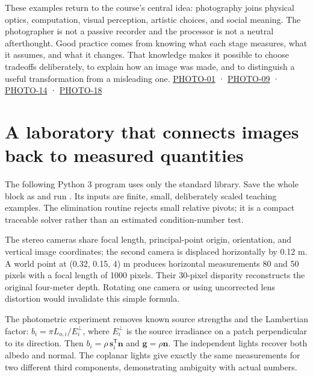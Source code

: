 These examples return to the course's central idea: photography joins physical optics, computation, visual perception, artistic choices, and social meaning. The photographer is not a passive recorder and the processor is not a neutral afterthought. Good practice comes from knowing what each stage measures, what it assumes, and what it changes. That knowledge makes it possible to choose tradeoffs deliberately, to explain how an image was made, and to distinguish a useful transformation from a misleading one. \hyperref[04-visual-computing-ii-ch036-photo-01---photography-session-01]{PHOTO-01} · \hyperref[04-visual-computing-ii-ch036-photo-09---photography-session-09]{PHOTO-09} · \hyperref[04-visual-computing-ii-ch036-photo-14---photography-session-14]{PHOTO-14} · \hyperref[04-visual-computing-ii-ch036-photo-18---photography-session-18]{PHOTO-18}

\section{A laboratory that connects images back to measured quantities}\label{04-visual-computing-ii-ch034-a-laboratory-that-connects-images-back-to-measured-quantities}

\hypertarget{04-visual-computing-ii-ch034-a-laboratory-that-connects-images-back-to-measured-quantities}{}

The following Python 3 program uses only the standard library. Save the whole block as  and run . Its inputs are finite, small, deliberately scaled teaching examples. The elimination routine rejects small relative pivots; it is a compact traceable solver rather than an estimated condition-number test.

The stereo cameras share focal length, principal-point origin, orientation, and vertical image coordinates; the second camera is displaced horizontally by 0.12 m. A world point at (0.32, 0.15, 4) m produces horizontal measurements 80 and 50 pixels with a focal length of 1000 pixels. Their 30-pixel disparity reconstructs the original four-meter depth. Rotating one camera or using uncorrected lens distortion would invalidate this simple formula.

The photometric experiment removes known source strengths and the Lambertian factor: \(b_i=\pi L_{o,i}/E_i^\perp\), where \(E_i^\perp\) is the source irradiance on a patch perpendicular to its direction. Then \(b_i=\rho\,\mathbf s_i^\mathsf T\mathbf n\) and \(\mathbf g=\rho\mathbf n\). The independent lights recover both albedo and normal. The coplanar lights give exactly the same measurements for two different third components, demonstrating ambiguity with actual numbers.

